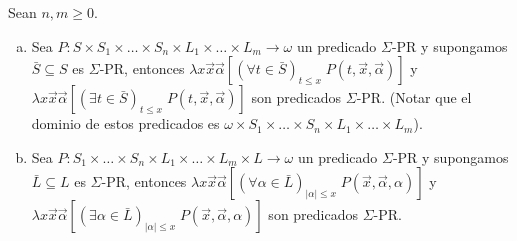   \begin{lemma}
    \par Sean $n, m \geq 0$.

    \begin{enumerate}[a)]
      \item Sea $P: S \times S_{1} \times \dotsc \times S_{n} \times L_{1} \times \dotsc \times L_{m} \rightarrow
        \omega$ un predicado $\Sigma$-PR y supongamos $\bar{S} \subseteq S$ es $\Sigma$-PR, entonces $\lambda
        x\vec{x}\vec{\alpha} \left[(\forall t\in \bar{S})_{t\leq x} \; P(t,\vec{x},\vec{\alpha})\right]$ y $\lambda
        x\vec{x}\vec{\alpha} \left[(\exists t\in \bar{S})_{t\leq x} \; P(t,\vec{x},\vec{\alpha})\right]$ son predicados
        $\Sigma$-PR. (Notar que el dominio de estos predicados es $\omega \times S_{1} \times \dotsc \times S_{n} \times
        L_{1} \times \dotsc \times L_{m}$).
      \item Sea $P: S_{1} \times \dotsc \times S_{n} \times L_{1} \times \dotsc \times L_{m} \times L \rightarrow
        \omega$ un predicado $\Sigma$-PR y supongamos $\bar{L} \subseteq L$ es $\Sigma$-PR, entonces $\lambda
        x\vec{x}\vec{\alpha} \left[(\forall \alpha \in \bar{L})_{\left\vert \alpha \right\vert \leq x} \;
        P(\vec{x},\vec{\alpha},\alpha)\right]$ y $\lambda x\vec{x}\vec{\alpha} \left[(\exists \alpha \in
        \bar{L})_{\left\vert \alpha \right\vert \leq x} \; P(\vec{x},\vec{\alpha},\alpha )\right]$ son predicados
        $\Sigma$-PR.
    \end{enumerate}
  \end{lemma}
